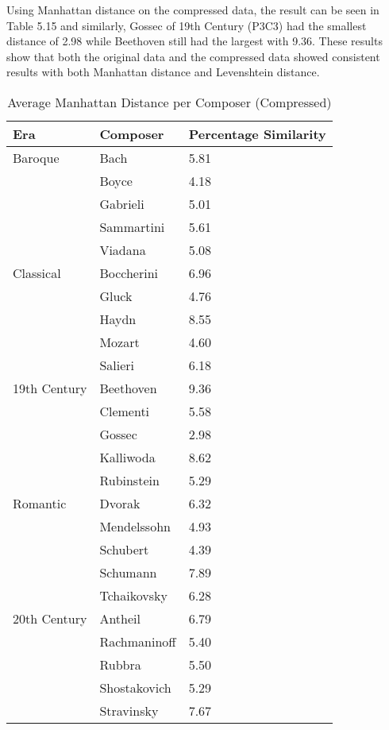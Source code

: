 Using Manhattan distance on the compressed data, the result can be seen in Table 5.15 and similarly, Gossec of 19th Century (P3C3) had the smallest distance of 2.98 while Beethoven still had the largest with 9.36. These results show that both the original data and the compressed data showed consistent results with both Manhattan distance and Levenshtein distance.

\begin{longtable}{|l|l|l|}
\caption{Average Manhattan Distance per Composer (Compressed)}
\label{my-label}\\
\hline
Era & Composer & Percentage Similarity \\ \hline
\endfirsthead
%
\endhead
%
Baroque & Bach & 5.81 \\ \hline
 & Boyce & 4.18 \\ \hline
 & Gabrieli & 5.01 \\ \hline
 & Sammartini & 5.61 \\ \hline
 & Viadana & 5.08 \\ \hline
Classical & Boccherini & 6.96 \\ \hline
 & Gluck & 4.76 \\ \hline
 & Haydn & 8.55 \\ \hline
 & Mozart & 4.60 \\ \hline
 & Salieri & 6.18 \\ \hline
19th Century & Beethoven & 9.36 \\ \hline
 & Clementi & 5.58 \\ \hline
 & Gossec & 2.98 \\ \hline
 & Kalliwoda & 8.62 \\ \hline
 & Rubinstein & 5.29 \\ \hline
Romantic & Dvorak & 6.32 \\ \hline
 & Mendelssohn & 4.93 \\ \hline
 & Schubert & 4.39 \\ \hline
 & Schumann & 7.89 \\ \hline
 & Tchaikovsky & 6.28 \\ \hline
20th Century & Antheil & 6.79 \\ \hline
 & Rachmaninoff & 5.40 \\ \hline
 & Rubbra & 5.50 \\ \hline
 & Shostakovich & 5.29 \\ \hline
 & Stravinsky & 7.67 \\ \hline
\end{longtable}